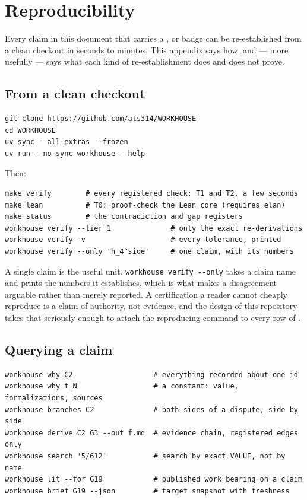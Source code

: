 \section{Reproducibility}
\label{app:repro}

Every claim in this document that carries a \Tzero{}, \Tone{} or
\Ttwo{} badge can be re-established from a clean checkout in seconds to
minutes. This appendix says how, and --- more usefully --- says what each
kind of re-establishment does and does not prove.

\subsection{From a clean checkout}

\begin{verbatim}
git clone https://github.com/ats314/WORKHOUSE
cd WORKHOUSE
uv sync --all-extras --frozen
uv run --no-sync workhouse --help
\end{verbatim}

Then:

\begin{verbatim}
make verify        # every registered check: T1 and T2, a few seconds
make lean          # T0: proof-check the Lean core (requires elan)
make status        # the contradiction and gap registers
workhouse verify --tier 1              # only the exact re-derivations
workhouse verify -v                    # every tolerance, printed
workhouse verify --only 'h_4^side'     # one claim, with its numbers
\end{verbatim}

A single claim is the useful unit. \texttt{workhouse verify -{}-only} takes a
claim name and prints the numbers it establishes, which is what makes a
disagreement arguable rather than merely reported. A certification a
reader cannot cheaply reproduce is a claim of authority, not evidence,
and the design of this repository takes that seriously enough to attach
the reproducing command to every row of .

\subsection{Querying a claim}

\begin{verbatim}
workhouse why C2                   # everything recorded about one id
workhouse why t_N                  # a constant: value, formalizations, sources
workhouse branches C2              # both sides of a dispute, side by side
workhouse derive C2 G3 --out f.md  # evidence chain, registered edges only
workhouse search '5/612'           # search by exact VALUE, not by name
workhouse lit --for G19            # published work bearing on a claim
workhouse brief G19 --json         # target snapshot with freshness
\end{verbatim}

